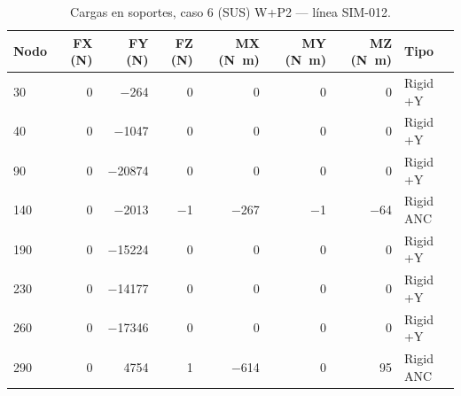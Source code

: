\begin{table}[htbp]
  \centering
  \footnotesize
  \caption{Cargas en soportes, caso 6 (SUS) W+P2 — línea SIM-012.}
  \label{tab:restricciones-sus}
  \begin{tabular}{lrrrrrrl}
    \toprule
    Nodo & FX (\si{N}) & FY (\si{N}) & FZ (\si{N}) & MX (\si{N.m}) & MY (\si{N.m}) & MZ (\si{N.m}) & Tipo \\
    \midrule
    30 & \num{0} & \num{-264} & \num{0} & \num{0} & \num{0} & \num{0} & Rigid +Y \\
    40 & \num{0} & \num{-1047} & \num{0} & \num{0} & \num{0} & \num{0} & Rigid +Y \\
    90 & \num{0} & \num{-20874} & \num{0} & \num{0} & \num{0} & \num{0} & Rigid +Y \\
    140 & \num{0} & \num{-2013} & \num{-1} & \num{-267} & \num{-1} & \num{-64} & Rigid ANC \\
    190 & \num{0} & \num{-15224} & \num{0} & \num{0} & \num{0} & \num{0} & Rigid +Y \\
    230 & \num{0} & \num{-14177} & \num{0} & \num{0} & \num{0} & \num{0} & Rigid +Y \\
    260 & \num{0} & \num{-17346} & \num{0} & \num{0} & \num{0} & \num{0} & Rigid +Y \\
    290 & \num{0} & \num{4754} & \num{1} & \num{-614} & \num{0} & \num{95} & Rigid ANC \\
    \bottomrule
  \end{tabular}
\end{table}

